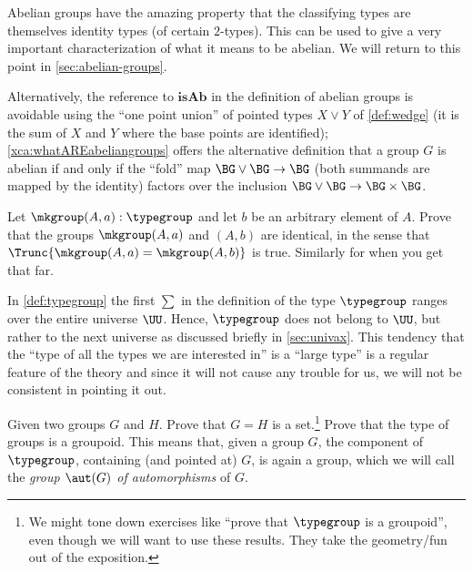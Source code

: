 \begin{remark}
  \label{rem:whatAREabeliangroups}

  Abelian groups have the amazing property that the classifying types are themselves identity types (of certain $2$-types).
  This can be used to give a very important characterization of what it means to be abelian.
  We will return to this point in \cref{sec:abelian-groups}.

  Alternatively, the reference to $\mathbf{isAb}$ in the definition of abelian groups is avoidable using the ``one point union'' of pointed types $X\vee Y$ of \cref{def:wedge} (it is the sum of $X$ and $Y$ where the base points are identified); \cref{xca:whatAREabeliangroups}
  offers the alternative definition that a group $G$ is abelian if and only if the ``fold'' map $\BG\vee \BG\to \BG$ (both summands are mapped by the identity) factors over the inclusion $\BG\vee\BG\to\BG\times\BG$.
\end{remark}
\begin{xca}
  Let $\mkgroup(A,a):\typegroup$ and let $b$ be an arbitrary element of $A$.  Prove that the groups $\mkgroup(A,a)$ and $(A,b)$ are identical, in the sense that $\Trunc{\mkgroup(A,a)=\mkgroup(A,b)}$ is true.
  Similarly for \inftygps when you get that far.
\end{xca}
\begin{remark}\label{rem:monoidandabsgplarge}
 In \cref{def:typegroup} the first $\sum$ in the definition of the type $\typegroup$ ranges over the entire universe $\UU$.  Hence, $\typegroup$ does not belong to $\UU$, but rather to the next universe as discussed briefly in \cref{sec:univax}.   This tendency that the ``type of all the types we are interested in'' is a ``large type'' is a regular feature of the theory and since it will not cause any trouble for us, we will not be consistent in pointing it out.
  \end{remark}

  \begin{xca}\label{xca:typegroupisgroupoid}
    Given two groups $G$ and $H$.  Prove that $G=H$ is a set.\footnote{We might tone down exercises like ``prove that $\typegroup$ is a groupoid'', even though we will want to use these results.  They take the geometry/fun out of the exposition.}   Prove that the type of groups is a groupoid.  This means that, given a group $G$, the component of $\typegroup$, containing (and pointed at) $G$, is again a group, which we will call the \emph{group $\aut(G)$ of automorphisms} of $G$.
  \end{xca}

